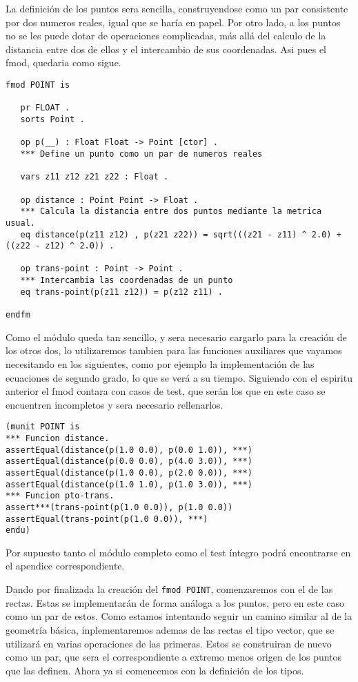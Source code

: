 La definición de los puntos sera sencilla, construyendose como un par consistente por dos numeros reales, igual que se haría en papel. Por otro lado, a los puntos no se les puede dotar de operaciones complicadas, más allá del calculo de la distancia entre dos de ellos y el intercambio de sus coordenadas. Asi pues el fmod, quedaria como sigue.
{\codesize
\begin{verbatim}
fmod POINT is

   pr FLOAT .
   sorts Point .

   op p(__) : Float Float -> Point [ctor] .
   *** Define un punto como un par de numeros reales

   vars z11 z12 z21 z22 : Float .

   op distance : Point Point -> Float .
   *** Calcula la distancia entre dos puntos mediante la metrica usual.
   eq distance(p(z11 z12) , p(z21 z22)) = sqrt(((z21 - z11) ^ 2.0) + ((z22 - z12) ^ 2.0)) .

   op trans-point : Point -> Point .
   *** Intercambia las coordenadas de un punto
   eq trans-point(p(z11 z12)) = p(z12 z11) .

endfm
\end{verbatim}
}
Como el módulo queda tan sencillo, y sera necesario cargarlo para la creación de los otros dos, lo utilizaremos tambien para las funciones auxiliares que vayamos necesitando en los siguientes, como por ejemplo la implementación de las ecuaciones de segundo grado, lo que se verá a su tiempo. Siguiendo con el espiritu anterior el fmod contara con casos de test, que serán los que en este caso se encuentren incompletos y sera necesario rellenarlos. \par

{\codesize
\begin{verbatim}
(munit POINT is
*** Funcion distance.
assertEqual(distance(p(1.0 0.0), p(0.0 1.0)), ***)
assertEqual(distance(p(0.0 0.0), p(4.0 3.0)), ***)
assertEqual(distance(p(1.0 0.0), p(2.0 0.0)), ***)
assertEqual(distance(p(1.0 1.0), p(1.0 3.0)), ***)
*** Funcion pto-trans.
assert***(trans-point(p(1.0 0.0)), p(1.0 0.0))
assertEqual(trans-point(p(1.0 0.0)), ***)
endu)
\end{verbatim}
}

Por supuesto tanto el módulo completo como el test íntegro podrá encontrarse en el apendice correspondiente.\par

Dando por finalizada la creación del \texttt{fmod POINT}, comenzaremos con el de las rectas. Estas se implementarán de forma análoga a los puntos, pero en este caso como un par de estos. Como estamos intentando seguir un camino similar al de la geometría básica, inplementaremos ademas de las rectas el tipo vector, que se utilizará en varias operaciones de las primeras. Estos se construiran de nuevo como un par, que sera el correspondiente a extremo menos origen de los puntos que las definen. Ahora ya si comencemos con la definición de los tipos.\par 

